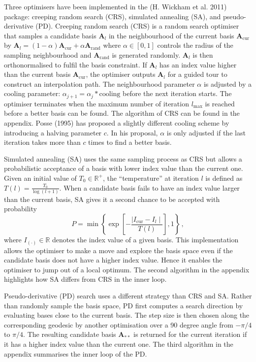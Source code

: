 Three optimisers have been implemented in the  (H. Wickham et al. 2011) package: creeping random search (CRS), simulated annealing (SA), and pseudo-derivative (PD). Creeping random search (CRS) is a random search optimiser that samples a candidate basis \(\mathbf{A}_{l}\) in the neighbourhood of the current basis \(\mathbf{A}_{\text{cur}}\) by \(\mathbf{A}_{l} = (1- \alpha)\mathbf{A}_{\text{cur}} + \alpha \mathbf{A}_{\text{rand}}\) where \(\alpha \in [0,1]\) controls the radius of the sampling neighbourhood and \(\mathbf{A}_{\text{rand}}\) is generated randomly. \(\mathbf{A}_{l}\) is then orthonormalised to fulfil the basis constraint. If \(\mathbf{A}_{l}\) has an index value higher than the current basis \(\mathbf{A}_{\text{cur}}\), the optimiser outputs \(\mathbf{A}_{l}\) for a guided tour to construct an interpolation path. The neighbourhood parameter \(\alpha\) is adjusted by a cooling parameter: \(\alpha_{j+1} = \alpha_j * \text{cooling}\) before the next iteration starts. The optimiser terminates when the maximum number of iteration \(l_{\max}\) is reached before a better basis can be found. The algorithm of CRS can be found in the appendix. Posse (1995) has proposed a slightly different cooling scheme by introducing a halving parameter \(c\). In his proposal, \(\alpha\) is only adjusted if the last iteration takes more than \(c\) times to find a better basis.

Simulated annealing (SA) uses the same sampling process as CRS but allows a probabilistic acceptance of a basis with lower index value than the current one. Given an initial value of \(T_0 \in \mathbb{R^{+}}\), the ``temperature'' at iteration \(l\) is defined as \(T(l) = \frac{T_0}{\log(l + 1)}\). When a candidate basis fails to have an index value larger than the current basis, SA gives it a second chance to be accepted with probability \[P= \min\left\{\exp\left[-\frac{\mid I_{\text{cur}} - I_{l} \mid}{T(l)}\right],1\right\} \,,\] where \(I_{(\cdot)} \in \mathbb{R}\) denotes the index value of a given basis. This implementation allows the optimiser to make a move and explore the basis space even if the candidate basis does not have a higher index value. Hence it enables the optimiser to jump out of a local optimum. The second algorithm in the appendix highlights how SA differs from CRS in the inner loop.

Pseudo-derivative (PD) search uses a different strategy than CRS and SA. Rather than randomly sample the basis space, PD first computes a search direction by evaluating bases close to the current basis. The step size is then chosen along the corresponding geodesic by another optimisation over a 90 degree angle from \(-\pi/4\) to \(\pi/4\). The resulting candidate basis \(\mathbf{A}_{**}\) is returned for the current iteration if it has a higher index value than the current one. The third algorithm in the appendix summarises the inner loop of the PD.

